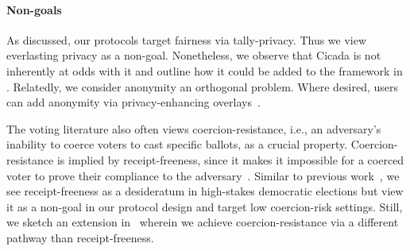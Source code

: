 \paragraph{Non-goals}
As discussed, our protocols target fairness via tally-privacy. Thus we view everlasting privacy as a non-goal. Nonetheless, we observe that Cicada is not inherently at odds with it and outline how it could be added to the framework in .
Relatedly, we consider anonymity an orthogonal problem. Where desired, users can add anonymity via privacy-enhancing overlays~\cite{PerSemSto19,semaphore,CCS:Neff01}. 

The voting literature also often views coercion-resistance, i.e., an adversary's inability to coerce voters to cast specific ballots, as a crucial property. Coercion-resistance is implied by receipt-freeness, since it makes it impossible for a coerced voter to prove their compliance to the adversary~\cite{STOC:BenTui94}. Similar to previous work~\cite{USENIX:Adida08}, we see receipt-freeness as a desideratum in high-stakes democratic elections but view it as a non-goal in our protocol design and target low coercion-risk settings. Still, we sketch an extension in~ wherein we achieve coercion-resistance via a different pathway than receipt-freeness. %